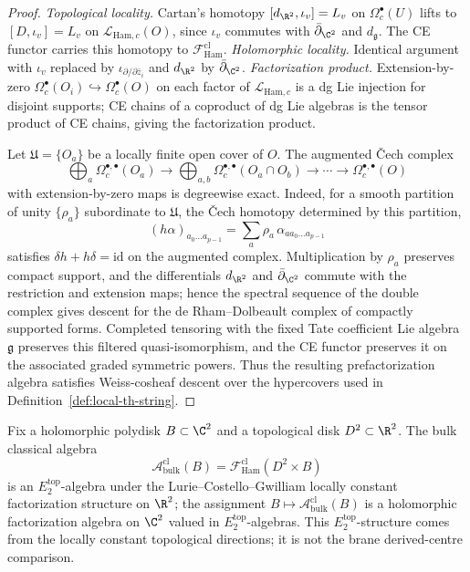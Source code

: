 \documentclass[11pt]{memoir}
\begin{document}
\begin{proof}
  \emph{Topological locality.}  Cartan's homotopy
  \([d_{\R^2},\iota_v]=L_v\) on \(\Omega^\bullet_c(U)\) lifts to
  \([D,\iota_v]=L_v\) on
  \(\mathcal L_{\mathrm{Ham},c}(O)\), since \(\iota_v\) commutes with
  \(\bar\partial_{\C^2}\) and \(d_{\mathfrak g}\).  The CE functor
  carries this homotopy to
  \(\mathcal F^{\mathrm{cl}}_{\mathrm{Ham}}\).
  \emph{Holomorphic locality.}  Identical argument with \(\iota_v\)
  replaced by \(\iota_{\partial/\partial\bar z_i}\) and \(d_{\R^2}\) by
  \(\bar\partial_{\C^2}\).  \emph{Factorization product.}
  Extension-by-zero
  \(\Omega^\bullet_c(O_i)\hookrightarrow\Omega^\bullet_c(O)\) on each
  factor of \(\mathcal L_{\mathrm{Ham},c}\) is a dg Lie injection for
  disjoint supports; CE chains of a coproduct of dg Lie algebras is the
  tensor product of CE chains, giving the factorization product.

  Let \(\mathfrak U=\{O_a\}\) be a locally finite open cover of \(O\).
  The augmented \v Cech complex
  \[
    \bigoplus_a\Omega_c^{\bullet,\bullet}(O_a)
    \longrightarrow
    \bigoplus_{a,b}\Omega_c^{\bullet,\bullet}(O_a\cap O_b)
    \longrightarrow\cdots
    \longrightarrow
    \Omega_c^{\bullet,\bullet}(O)
  \]
  with extension-by-zero maps is degreewise exact.  Indeed, for a
  smooth partition of unity \(\{\rho_a\}\) subordinate to
  \(\mathfrak U\), the \v Cech homotopy determined by this partition,
  \[
    (h\alpha)_{a_0\ldots a_{p-1}}
      =
    \sum_a \rho_a\,\alpha_{a a_0\ldots a_{p-1}}
  \]
  satisfies \(\delta h+h\delta=\mathrm{id}\) on the augmented complex.
  Multiplication by \(\rho_a\) preserves compact support, and the
  differentials \(d_{\R^2}\) and \(\bar\partial_{\C^2}\) commute with
  the restriction and extension maps; hence the spectral sequence of
  the double complex gives descent for the de Rham--Dolbeault complex of
  compactly supported forms.  Completed tensoring with the fixed Tate
  coefficient Lie algebra \(\mathfrak g\) preserves this filtered
  quasi-isomorphism, and the CE functor preserves it on the associated
  graded symmetric powers.  Thus the resulting prefactorization algebra
  satisfies Weiss-cosheaf descent over the hypercovers used in
  Definition~\ref{def:local-th-string}.
\end{proof}

\begin{cor}
\label{cor:E2-bulk-algebra}
  Fix a holomorphic polydisk \(B\subset\C^2\) and a topological disk
  \(D^2\subset\R^2\). The bulk classical algebra
  \[
    \mathcal A^{\mathrm{cl}}_{\mathrm{bulk}}(B)
      =\mathcal F^{\mathrm{cl}}_{\mathrm{Ham}}(D^2\times B)
  \]
  is an \(E_2^{\mathrm{top}}\)-algebra under the Lurie--Costello--Gwilliam
  locally constant factorization structure on \(\R^2\);
  the assignment
  \(B\mapsto\mathcal A^{\mathrm{cl}}_{\mathrm{bulk}}(B)\) is a holomorphic
  factorization algebra on \(\C^2\) valued in
  \(E_2^{\mathrm{top}}\)-algebras.  This
  \(E_2^{\mathrm{top}}\)-structure comes from the locally constant
  topological
  directions; it is not the brane derived-centre comparison.
\end{cor}
\end{document}
